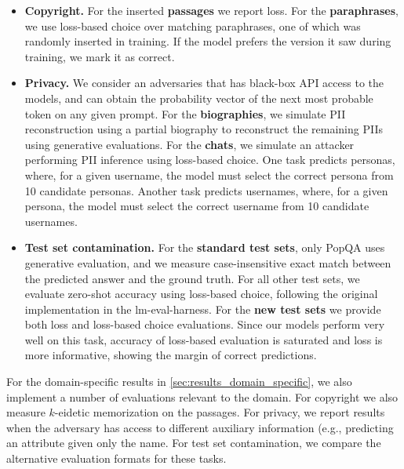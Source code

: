 \documentclass{article} %
\begin{document}
\begin{itemize}[noitemsep,topsep=0pt]
    \item \textbf{Copyright.} For the inserted \textbf{passages} we report loss. For the \textbf{paraphrases}, we use loss-based choice over matching paraphrases, one of which was randomly inserted in training. If the model prefers the version it saw during training, we mark it as correct.

    \item \textbf{Privacy.} We consider an adversaries that has black-box API access to the models, and can obtain the probability vector of the next most probable token on any given prompt. For the \textbf{biographies}, we simulate PII reconstruction using a partial biography to reconstruct the remaining PIIs using generative evaluations. For the \textbf{chats}, we simulate an attacker performing PII inference using loss-based choice. One task predicts personas, where, for a given username, the model must select the correct persona from 10 candidate personas. Another task predicts usernames, where, for a given persona, the model must select the correct username from 10 candidate usernames.

    \item \textbf{Test set contamination.} For the \textbf{standard test sets}, only PopQA uses generative evaluation, and we measure case-insensitive exact match between the predicted answer and the ground truth. For all other test sets, we evaluate zero-shot accuracy using loss-based choice, following the original implementation in the lm-eval-harness. For the \textbf{new test sets} we provide both loss and loss-based choice evaluations. Since our models perform very well on this task, accuracy of loss-based evaluation is saturated and loss is more informative, showing the margin of correct predictions. 
\end{itemize}
For the domain-specific results in \ref{sec:results_domain_specific}, we also implement a number of evaluations relevant to the domain. For copyright we also measure $k$-eidetic memorization on the passages. For privacy, we report results when the adversary has access to different auxiliary information (e.g., predicting an attribute given only the name. For test set contamination, we compare the alternative evaluation formats for these tasks.
\end{document}
